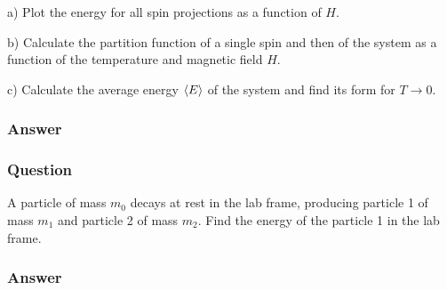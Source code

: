 a) Plot the energy for all spin projections as a function of $H$.

b) Calculate the partition function of a single spin and then of the system as a function of the temperature and magnetic field $H$.

c) Calculate the average energy $\expval{E}$ of the system and find its form for $T \to 0$.
\subsubsection{Answer}


\subsubsection{Question}
A particle of mass $m_0$ decays at rest in the lab frame, producing particle 1 of mass $m_1$ and particle 2 of mass $m_2$. Find the energy of the particle 1 in the lab frame.
\subsubsection{Answer}


